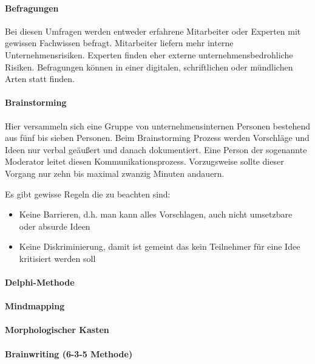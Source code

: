 \documentclass[12pt, oneside]{article}
\begin{document}
\paragraph{Befragungen}
Bei diesen Umfragen werden entweder erfahrene Mitarbeiter oder Experten mit gewissen Fachwissen befragt. Mitarbeiter liefern mehr interne Unternehmensrisiken. Experten finden eher externe unternehmensbedrohliche Risiken. Befragungen können in einer digitalen, schriftlichen oder mündlichen Arten statt finden.

\paragraph{Brainstorming}
Hier versammeln sich eine Gruppe von unternehmensinternen Personen bestehend aus fünf bis sieben Personen. Beim Brainstorming Prozess werden Vorschläge und Ideen nur verbal geäußert und  danach dokumentiert. Eine Person der sogenannte Moderator leitet diesen Kommunikationsprozess. Vorzugsweise sollte dieser Vorgang nur zehn bis maximal zwanzig Minuten andauern.

Es gibt gewisse Regeln die zu beachten sind:
\begin{itemize}
	\item Keine Barrieren, d.h. man kann alles Vorschlagen, auch nicht umsetzbare oder absurde Ideen
	\item Keine Diskriminierung, damit ist gemeint das kein Teilnehmer für eine Idee kritisiert werden soll
\end{itemize}


\paragraph{Delphi-Methode}


\paragraph{Mindmapping}

\paragraph{Morphologischer Kasten}

\paragraph{Brainwriting (6-3-5 Methode)}
\end{document}
